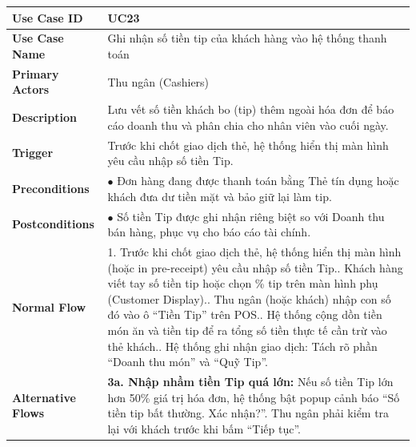 \begin{longtable}{|L{3.5cm}|L{12.5cm}|}
\hline
\textbf{Use Case ID} & UC23 \\ \hline
\textbf{Use Case Name} & Ghi nhận số tiền tip của khách hàng vào hệ thống thanh toán \\ \hline
\textbf{Primary Actors} & Thu ngân (Cashiers) \\ \hline
\textbf{Description} & Lưu vết số tiền khách bo (tip) thêm ngoài hóa đơn để báo cáo doanh thu và phân chia cho nhân viên vào cuối ngày. \\ \hline
\textbf{Trigger} & Trước khi chốt giao dịch thẻ, hệ thống hiển thị màn hình yêu cầu nhập số tiền Tip. \\ \hline
\textbf{Preconditions} &
$\bullet$ Đơn hàng đang được thanh toán bằng Thẻ tín dụng hoặc khách đưa dư tiền mặt và bảo giữ lại làm tip. \\ \hline
\textbf{Postconditions} & $\bullet$ Số tiền Tip được ghi nhận riêng biệt so với Doanh thu bán hàng, phục vụ cho báo cáo tài chính. \\ \hline
\textbf{Normal Flow} &
1. Trước khi chốt giao dịch thẻ, hệ thống hiển thị màn hình (hoặc in pre-receipt) yêu cầu nhập số tiền Tip.. Khách hàng viết tay số tiền tip hoặc chọn \% tip trên màn hình phụ (Customer Display).. Thu ngân (hoặc khách) nhập con số đó vào ô ``Tiền Tip'' trên POS.. Hệ thống cộng dồn tiền món ăn và tiền tip để ra tổng số tiền thực tế cần trừ vào thẻ khách.. Hệ thống ghi nhận giao dịch: Tách rõ phần ``Doanh thu món'' và ``Quỹ Tip''. \\ \hline
\textbf{Alternative Flows} &
\textbf{3a. Nhập nhầm tiền Tip quá lớn:} Nếu số tiền Tip lớn hơn 50\% giá trị hóa đơn, hệ thống bật popup cảnh báo ``Số tiền tip bất thường. Xác nhận?''. Thu ngân phải kiểm tra lại với khách trước khi bấm ``Tiếp tục''. \\ \hline
\end{longtable}

